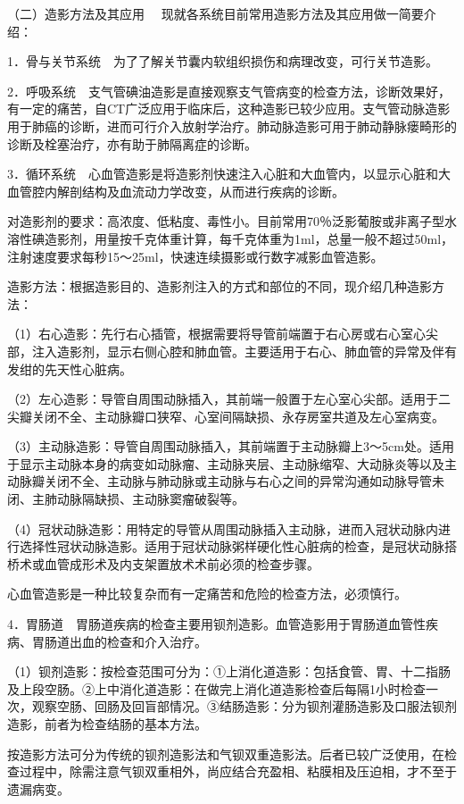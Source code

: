 （二）{造影方法及其应用}
　现就各系统目前常用造影方法及其应用做一简要介绍：

1．骨与关节系统　为了了解关节囊内软组织损伤和病理改变，可行关节造影。

2．呼吸系统　支气管碘油造影是直接观察支气管病变的检查方法，诊断效果好，有一定的痛苦，自CT广泛应用于临床后，这种造影已较少应用。支气管动脉造影用于肺癌的诊断，进而可行介入放射学治疗。肺动脉造影可用于肺动静脉瘘畸形的诊断及栓塞治疗，亦有助于肺隔离症的诊断。

3．循环系统　心血管造影是将造影剂快速注入心脏和大血管内，以显示心脏和大血管腔内解剖结构及血流动力学改变，从而进行疾病的诊断。

对造影剂的要求：高浓度、低粘度、毒性小。目前常用70％泛影葡胺或非离子型水溶性碘造影剂，用量按千克体重计算，每千克体重为1ml，总量一般不超过50ml，注射速度要求每秒15～25ml，快速连续摄影或行数字减影血管造影。

造影方法：根据造影目的、造影剂注入的方式和部位的不同，现介绍几种造影方法：

（1）右心造影：先行右心插管，根据需要将导管前端置于右心房或右心室心尖部，注入造影剂，显示右侧心腔和肺血管。主要适用于右心、肺血管的异常及伴有发绀的先天性心脏病。

（2）左心造影：导管自周围动脉插入，其前端一般置于左心室心尖部。适用于二尖瓣关闭不全、主动脉瓣口狭窄、心室间隔缺损、永存房室共道及左心室病变。

（3）主动脉造影：导管自周围动脉插入，其前端置于主动脉瓣上3～5cm处。适用于显示主动脉本身的病变如动脉瘤、主动脉夹层、主动脉缩窄、大动脉炎等以及主动脉瓣关闭不全、主动脉与肺动脉或主动脉与右心之间的异常沟通如动脉导管未闭、主肺动脉隔缺损、主动脉窦瘤破裂等。

（4）冠状动脉造影：用特定的导管从周围动脉插入主动脉，进而入冠状动脉内进行选择性冠状动脉造影。适用于冠状动脉粥样硬化性心脏病的检查，是冠状动脉搭桥术或血管成形术及内支架置放术术前必须的检查步骤。

心血管造影是一种比较复杂而有一定痛苦和危险的检查方法，必须慎行。

4．胃肠道　胃肠道疾病的检查主要用钡剂造影。血管造影用于胃肠道血管性疾病、胃肠道出血的检查和介入治疗。

（1）钡剂造影：按检查范围可分为：①上消化道造影：包括食管、胃、十二指肠及上段空肠。②上中消化道造影：在做完上消化道造影检查后每隔1小时检查一次，观察空肠、回肠及回盲部情况。③结肠造影：分为钡剂灌肠造影及口服法钡剂造影，前者为检查结肠的基本方法。

按造影方法可分为传统的钡剂造影法和气钡双重造影法。后者已较广泛使用，在检查过程中，除需注意气钡双重相外，尚应结合充盈相、粘膜相及压迫相，才不至于遗漏病变。

